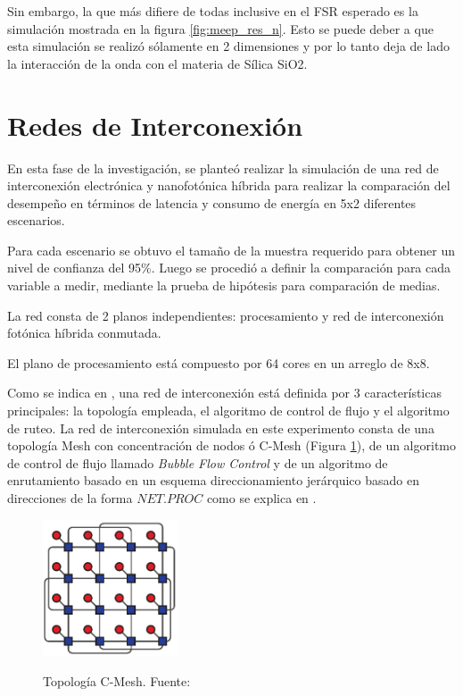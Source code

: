 \documentclass{IEEEtran}
\begin{document}
Sin embargo, la que más difiere de todas inclusive en el FSR esperado 
es la simulación mostrada en la figura \ref{fig:meep_res_n}. Esto se puede deber a
que esta simulación se realizó sólamente en 2 dimensiones y por lo tanto
deja de lado la interacción de la onda con el materia de Sílica SiO2.

\section{Redes de Interconexión}
En esta fase de la investigación, se planteó realizar la simulación de 
una red de interconexión electrónica y nanofotónica híbrida para 
realizar la comparación del desempeño en términos de latencia y consumo
de energía en 5x2 diferentes escenarios.

Para cada escenario se obtuvo el tamaño de la muestra requerido
para obtener un nivel de confianza del 95\%. Luego se procedió
a definir la comparación para cada variable a medir, 
mediante la prueba de hipótesis para comparación de medias. 

La red consta de 2 planos independientes: procesamiento y
red de interconexión fotónica híbrida conmutada. 

El plano de procesamiento está compuesto por 64 
cores en un arreglo de 8x8. 

Como se indica en \cite{dally2004principles}, una red de interconexión está definida
por 3 características principales: la topología empleada, el algoritmo de control de
flujo y el algoritmo de ruteo. La red de interconexión simulada en este experimento
consta de una topología Mesh con concentración de nodos ó C-Mesh (Figura \ref{fig:cmesh}), 
de un algoritmo de control de
flujo llamado \textit{Bubble Flow Control}\cite{puente1999adaptive}\cite{Manual} y
de un algoritmo de enrutamiento basado en un esquema direccionamiento jerárquico
basado en direcciones de la forma $NET.PROC$ como se explica en \cite{Manual}.

\begin{figure}
\caption{Topología C-Mesh. Fuente: \cite{Manual}}
\centering
\includegraphics[width=4cm,natwidth=333,natheight=336]{figs/cmesh.png}
\label{fig:cmesh}
\end{figure} 
\end{document}
